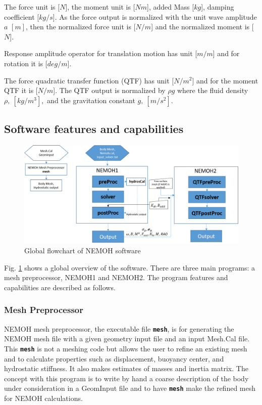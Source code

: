 \documentclass[12pt,a4paper,titlepage]{article}
\begin{document}
The force unit is [$N$], the moment unit is [$Nm$], added Mass [$kg$], damping coefficient [$kg/s$]. As the force output is normalized with the unit wave amplitude $a$ $[m]$, then the normalized force unit is [$N/m$] and the normalized moment is [$N$].

Response amplitude operator for translation motion has unit [$m/m$] and for rotation it is [$deg/m$].

The force quadratic transfer function (QTF) has unit [$N/m^2$] and for the moment QTF it is [$N/m$]. The QTF output is normalized by $\rho g$ where the fluid density $\rho,\ [kg/m^3],$ and the gravitation constant $g,\ [m/s^2]$.

\subsection{Software    features and capabilities}
\begin{figure}[ht]
\centering
\includegraphics[scale=0.6,trim = 0mm 0mm 0mm 0mm, clip]{figures/FlowChart.png}
\caption{Global flowchart of NEMOH software}\label{fig:flowchart}
\end{figure}

Fig. \ref{fig:flowchart} shows a global overview of the software. There are three main programs: a mesh preprocessor, NEMOH1 and NEMOH2. The program features and capabilities are described as follows.

\subsubsection{Mesh Preprocessor}
NEMOH mesh preprocessor, the executable file \texttt{\textbf{mesh}}, is for generating the NEMOH mesh file with a given geometry input file and an input Mesh.Cal file. This \texttt{\textbf{mesh}} is not a meshing code but allows the user to refine an existing mesh and to calculate properties such as displacement, buoyancy center, and hydrostatic stiffness. It also makes estimates of masses and inertia matrix. The concept with this program is to write by hand a coarse description of the body under consideration in a GeomInput file and to have \texttt{\textbf{mesh}} make the refined mesh for NEMOH calculations.
\end{document}
